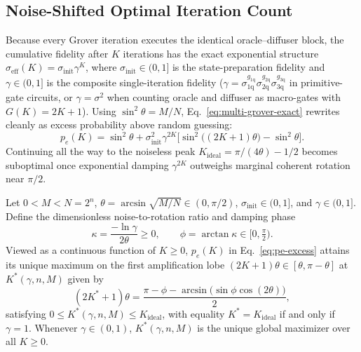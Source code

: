 

\subsection{Noise-Shifted Optimal Iteration Count}
\label{sec:optimal-stopping}

Because every Grover iteration executes the identical oracle--diffuser block, the cumulative fidelity after $K$ iterations has the exact exponential structure $\sigma_{\mathrm{eff}}(K) = \sigma_{\mathrm{init}}\gamma^K$, where $\sigma_{\mathrm{init}} \in (0, 1]$ is the state-preparation fidelity and $\gamma \in (0, 1]$ is the composite single-iteration fidelity ($\gamma = \sigma_{1\mathrm{q}}^{g_{1\mathrm{q}}}\sigma_{2\mathrm{q}}^{g_{2\mathrm{q}}}\sigma_{3\mathrm{q}}^{g_{3\mathrm{q}}}$ in primitive-gate circuits, or $\gamma = \sigma^2$ when counting oracle and diffuser as macro-gates with $G(K) = 2K + 1$). Using $\sin^2\theta = M/N$, Eq.~\eqref{eq:multi-grover-exact} rewrites cleanly as excess probability above random guessing:
\begin{equation}
p_e(K) = \sin^2\theta + \sigma_{\mathrm{init}}^2 \gamma^{2K}\bigl[\sin^2\bigl((2K + 1)\theta\bigr) - \sin^2\theta\bigr].
\label{eq:pe-excess}
\end{equation}
Continuing all the way to the noiseless peak $K_{\mathrm{ideal}} = \pi/(4\theta) - 1/2$ becomes suboptimal once exponential damping $\gamma^{2K}$ outweighs marginal coherent rotation near $\pi/2$.

\begin{proposition}
\label{prop:optimal-k}
Let $0 < M < N = 2^n$, $\theta = \arcsin\sqrt{M/N} \in (0, \pi/2)$, $\sigma_{\mathrm{init}} \in (0, 1]$, and $\gamma \in (0, 1]$. Define the dimensionless noise-to-rotation ratio and damping phase
\begin{equation}
\kappa = \frac{-\ln\gamma}{2\theta} \ge 0, \qquad \phi = \arctan\kappa \in \bigl[0, \tfrac{\pi}{2}\bigr).
\label{eq:kappa-def}
\end{equation}
Viewed as a continuous function of $K \ge 0$, $p_e(K)$ in Eq.~\eqref{eq:pe-excess} attains its unique maximum on the first amplification lobe $(2K + 1)\theta \in [\theta, \pi - \theta]$ at $K^*(\gamma, n, M)$ given by
\begin{equation}
(2K^* + 1)\theta = \frac{\pi - \phi - \arcsin\bigl(\sin\phi\cos(2\theta)\bigr)}{2},
\label{eq:optimal-k-exact}
\end{equation}
satisfying $0 \le K^*(\gamma, n, M) \le K_{\mathrm{ideal}}$, with equality $K^* = K_{\mathrm{ideal}}$ if and only if $\gamma = 1$. Whenever $\gamma \in (0, 1)$, $K^*(\gamma, n, M)$ is the unique global maximizer over all $K \ge 0$.
\end{proposition}

